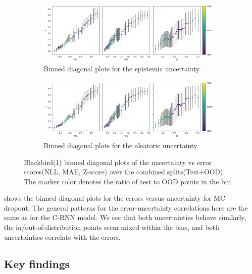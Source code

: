 \begin{figure}[htbp]
  \centering
    \begin{subfigure}[b]{\textwidth}
        \includegraphics[width=\textwidth]{Experiments/figs/binned/bb1_dropout_epistemic.png}
        \caption{Binned diagonal plots for the epistemic uncertainty.}
    \end{subfigure}
    
    \begin{subfigure}[b]{\textwidth}
        \includegraphics[width=\textwidth]{Experiments/figs/binned/bb1_dropout_aleatoric.png}
        \caption{Binned diagonal plots for the aleatoric uncertainty.}
  \end{subfigure}
    \caption[Blackbird(1) error-uncertainty diagonal plots for MC dropout]{Blackbird(1) binned diagonal plots of the  uncertainty vs error scores(NLL, MAE, Z-score) over the combined splits(Test+OOD). The marker color denotes the ratio of test to OOD points in the bin. }
    \label{fig:bb1_dropout_uncertainty_corr}
\end{figure}

 shows the binned diagonal plots for the errors versus uncertainty for MC dropout. The general patterns for the error-uncertainty correlations here are the same as for the C-RNN model. We see that both uncertainties behave similarly, the in/out-of-distribution points seem mixed within the bins, and both uncertainties correlate with the errors. 



\subsection{Key findings}

